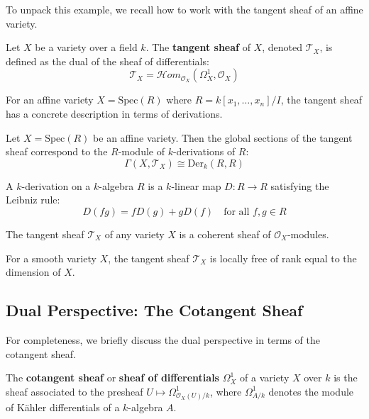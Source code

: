 \documentclass[12pt]{article}
\begin{document}
To unpack this example, we recall how to work with the tangent sheaf of an affine variety.
\begin{definition}
Let $X$ be a variety over a field $k$. The \textbf{tangent sheaf} of $X$, denoted $\mathcal{T}_X$, is defined as the dual of the sheaf of differentials:
\begin{equation}
\mathcal{T}_X = \mathcal{H}om_{\mathcal{O}_X}(\Omega^1_X, \mathcal{O}_X)
\end{equation}
\end{definition}

For an affine variety $X = \text{Spec}(R)$ where $R = k[x_1, \ldots, x_n]/I$, the tangent sheaf has a concrete description in terms of derivations.

\begin{proposition}
Let $X = \text{Spec}(R)$ be an affine variety. Then the global sections of the tangent sheaf correspond to the $R$-module of $k$-derivations of $R$:
\begin{equation}
\Gamma(X, \mathcal{T}_X) \cong \text{Der}_k(R, R)
\end{equation}
\end{proposition}

\begin{definition}
A $k$-derivation on a $k$-algebra $R$ is a $k$-linear map $D: R \to R$ satisfying the Leibniz rule:
\begin{equation}
D(fg) = fD(g) + gD(f) \quad \text{for all } f,g \in R
\end{equation}
\end{definition}


\begin{proposition}
The tangent sheaf $\mathcal{T}_X$ of any variety $X$ is a coherent sheaf of $\mathcal{O}_X$-modules.
\end{proposition}

\begin{proposition}
For a smooth variety $X$, the tangent sheaf $\mathcal{T}_X$ is locally free of rank equal to the dimension of $X$.
\end{proposition}

\subsection{Dual Perspective: The Cotangent Sheaf}

For completeness, we briefly discuss the dual perspective in terms of the cotangent sheaf.

\begin{definition}
The \textbf{cotangent sheaf} or \textbf{sheaf of differentials} $\Omega^1_X$ of a variety $X$ over $k$ is the sheaf associated to the presheaf $U \mapsto \Omega^1_{\mathcal{O}_X(U)/k}$, where $\Omega^1_{A/k}$ denotes the module of Kähler differentials of a $k$-algebra $A$.
\end{definition}
\end{document}
